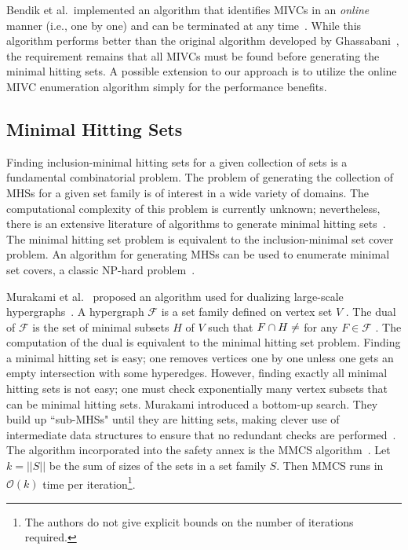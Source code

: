 Bendik et al.~implemented an algorithm that identifies MIVCs in an {\em online} manner (i.e., one by one) and can be terminated at any time~\cite{bendik2018online}. While this algorithm performs better than the original \aivcalg algorithm developed by Ghassabani~\cite{Ghassabani2017EfficientGO}, the requirement remains that all MIVCs must be found before generating the minimal hitting sets. A possible extension to our approach is to utilize the online MIVC enumeration algorithm simply for the performance benefits. 

\subsection{Minimal Hitting Sets}
Finding inclusion-minimal hitting sets for a given collection of sets is a fundamental combinatorial problem. The problem of generating the collection of MHSs for a given set family is of interest in a wide variety of domains. The computational complexity of this problem is currently unknown; nevertheless, there is an extensive literature of algorithms to generate minimal hitting sets~\cite{gainer2017minimal}. The minimal hitting set problem is equivalent to the inclusion-minimal set cover problem. An algorithm for generating MHSs can be used to enumerate minimal set covers, a classic NP-hard problem~\cite{karp1972reducibility}. 

Murakami et al.~ proposed an algorithm used for dualizing large-scale hypergraphs~\cite{murakami2013efficient}. A hypergraph $\mathcal{F}$ is a set family defined on vertex set $V$ . The dual of $\mathcal{F}$ is the set of minimal subsets $H$ of $V$ such that $F \cap H \not = \empty$ for any $F \in \mathcal{F}$ . The computation of the dual is equivalent to the minimal hitting set problem. Finding a minimal hitting set is easy; one removes vertices one by one unless one gets an empty intersection with some hyperedges. However, finding exactly all minimal hitting sets is not easy; one must check exponentially many vertex subsets that can be minimal hitting sets. Murakami introduced a bottom-up search. They build up ``sub-MHSs" until they are hitting sets, making clever use of intermediate data structures to ensure that no redundant checks are performed~\cite{gainer2017minimal}. The algorithm incorporated into the safety annex is the MMCS algorithm~\cite{murakami2013efficient}. Let $k = ||S||$ be the sum of sizes of the sets in a set family $S$. Then MMCS runs in $\mathcal{O}(k)$ time per iteration\footnote{The authors do not give explicit bounds on the number of iterations required.}.


